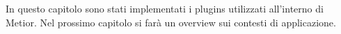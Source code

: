 In questo capitolo sono stati implementati i plugins utilizzati all'interno di Metior.
Nel prossimo capitolo si farà un overview sui contesti di applicazione.
